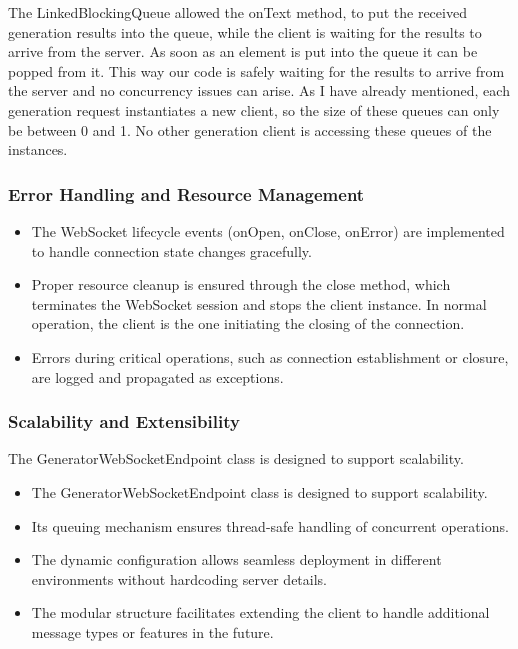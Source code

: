 				The LinkedBlockingQueue allowed the onText method, to put the received generation
				results into the queue, while the client is waiting for the results to arrive from the server. As soon as an element is put into the queue
				it can be popped from it. This way our code is safely waiting for the results
				to arrive from the server and no concurrency issues can arise. As I have already mentioned, each generation request instantiates a new
				client, so the size of these queues can only be between 0 and 1. No other generation client is accessing these queues of the instances.

			\subsubsection{Error Handling and Resource Management}
				\begin{itemize}
					\item The WebSocket lifecycle events (onOpen, onClose, onError) are implemented to handle connection state changes gracefully.
					\item Proper resource cleanup is ensured through the close method, which terminates the WebSocket session and stops the client instance.
					In normal operation, the client is the one initiating the closing of the connection.
					\item Errors during critical operations, such as connection establishment or closure, are logged and propagated as exceptions.
				\end{itemize} 

			\subsubsection{Scalability and Extensibility} 
				The GeneratorWebSocketEndpoint class is designed to support scalability.
				\begin{itemize}
					\item The GeneratorWebSocketEndpoint class is designed to support scalability.
					\item Its queuing mechanism ensures thread-safe handling of concurrent operations.
					\item The dynamic configuration allows seamless deployment in different environments without hardcoding server details.
					\item The modular structure facilitates extending the client to handle additional message types or features in the future.
				\end{itemize} 

